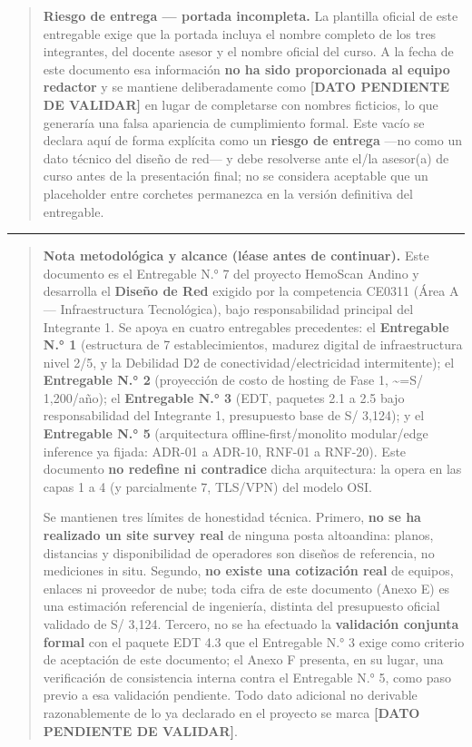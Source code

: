 \documentclass[11pt,a4paper]{article}
\begin{document}
\begin{quote}
\textbf{Riesgo de entrega --- portada incompleta.} La plantilla oficial de este entregable exige que la portada incluya el nombre completo de los tres integrantes, del docente asesor y el nombre oficial del curso. A la fecha de este documento esa información \textbf{no ha sido proporcionada al equipo redactor} y se mantiene deliberadamente como \textbf{{[}DATO PENDIENTE DE VALIDAR{]}} en lugar de completarse con nombres ficticios, lo que generaría una falsa apariencia de cumplimiento formal. Este vacío se declara aquí de forma explícita como un \textbf{riesgo de entrega} ---no como un dato técnico del diseño de red--- y debe resolverse ante el/la asesor(a) de curso antes de la presentación final; no se considera aceptable que un placeholder entre corchetes permanezca en la versión definitiva del entregable.
\end{quote}

\begin{center}\rule{0.5\linewidth}{0.5pt}\end{center}

\begin{quote}
\textbf{Nota metodológica y alcance (léase antes de continuar).} Este documento es el Entregable N.° 7 del proyecto HemoScan Andino y desarrolla el \textbf{Diseño de Red} exigido por la competencia CE0311 (Área A --- Infraestructura Tecnológica), bajo responsabilidad principal del Integrante 1. Se apoya en cuatro entregables precedentes: el \textbf{Entregable N.° 1} (estructura de 7 establecimientos, madurez digital de infraestructura nivel 2/5, y la Debilidad D2 de conectividad/electricidad intermitente); el \textbf{Entregable N.° 2} (proyección de costo de hosting de Fase 1, \textasciitilde=S/ 1,200/año); el \textbf{Entregable N.° 3} (EDT, paquetes 2.1 a 2.5 bajo responsabilidad del Integrante 1, presupuesto base de S/ 3,124); y el \textbf{Entregable N.° 5} (arquitectura offline-first/monolito modular/edge inference ya fijada: ADR-01 a ADR-10, RNF-01 a RNF-20). Este documento \textbf{no redefine ni contradice} dicha arquitectura: la opera en las capas 1 a 4 (y parcialmente 7, TLS/VPN) del modelo OSI.

Se mantienen tres límites de honestidad técnica. Primero, \textbf{no se ha realizado un site survey real} de ninguna posta altoandina: planos, distancias y disponibilidad de operadores son diseños de referencia, no mediciones in situ. Segundo, \textbf{no existe una cotización real} de equipos, enlaces ni proveedor de nube; toda cifra de este documento (Anexo E) es una estimación referencial de ingeniería, distinta del presupuesto oficial validado de S/ 3,124. Tercero, no se ha efectuado la \textbf{validación conjunta formal} con el paquete EDT 4.3 que el Entregable N.° 3 exige como criterio de aceptación de este documento; el Anexo F presenta, en su lugar, una verificación de consistencia interna contra el Entregable N.° 5, como paso previo a esa validación pendiente. Todo dato adicional no derivable razonablemente de lo ya declarado en el proyecto se marca \textbf{{[}DATO PENDIENTE DE VALIDAR{]}}.
\end{quote}
\end{document}
